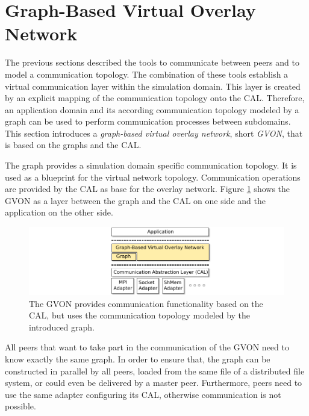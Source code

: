 \section{Graph-Based Virtual Overlay Network}
\label{sec:gvon}
The previous sections described the tools to communicate between
peers and to model a communication topology. The combination of these
tools establish a virtual communication layer within the simulation
domain. This layer is created by an explicit mapping of the
communication topology onto the CAL. Therefore, an application domain and its according
communication topology modeled by a graph can be used to perform
communication processes between subdomains.  This section introduces a
\emph{graph-based virtual overlay network}, short \emph{GVON},
that is based on the graphs and the CAL.

The graph provides a simulation domain specific communication
topology.  It is used as a blueprint for the virtual network topology.
Communication operations are provided by the CAL as base for the
overlay network.  Figure \ref{fig:gvon} shows the GVON as a layer
between the graph and the CAL on one side and the application on the other
side.

\begin{figure}[H]
  \centering \includegraphics[width=\textwidth]{graphics/30_gvon}
  \caption{The GVON provides communication functionality based on the
    CAL, but uses the communication topology modeled by the introduced
    graph.}
  \label{fig:gvon}
\end{figure}

\noindent All peers that want to take part in the communication of the GVON need
to know exactly the same graph. In order to ensure that, the graph can be
constructed in parallel by all peers, loaded from the same file of a
distributed file system, or could even be delivered by a master
peer. Furthermore, peers need to use the same adapter configuring its
CAL, otherwise communication is not possible.


